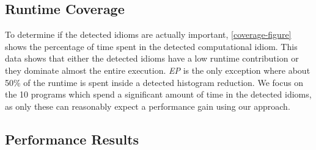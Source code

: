 \subsection{Runtime Coverage}

    To determine if the detected idioms are actually important,
    \autoref{coverage-figure} shows the percentage of time spent in the detected
    computational idiom.
    This data shows that either the detected idioms have a low runtime
    contribution or they dominate almost the entire execution.
    \emph{EP} is the only exception where about 50\% of the runtime is spent
    inside a detected histogram reduction.
    We focus on the 10 programs which spend a significant amount of time in the
    detected idioms, as only these can reasonably expect a performance gain
    using our approach.

\subsection{Performance Results}

